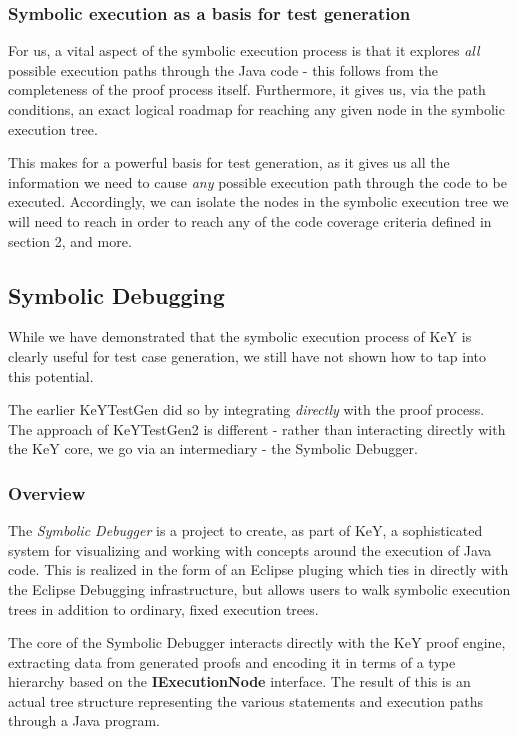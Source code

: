 \documentclass{article}
\newcommand{\tmem}[1]{{\em #1\/}}
\newcommand{\tmstrong}[1]{\textbf{#1}}
\begin{document}
\subsubsection{Symbolic execution as a basis for test generation}

For us, a vital aspect of the symbolic execution process is that it explores
{\tmem{all}} possible execution paths through the Java code - this follows
from the completeness of the proof process itself. Furthermore, it gives us,
via the path conditions, an exact logical roadmap for reaching any given node
in the symbolic execution tree.



This makes for a powerful basis for test generation, as it gives us all the
information we need to cause {\tmem{any}} possible execution path through the
code to be executed. Accordingly, we can isolate the nodes in the symbolic
execution tree we will need to reach in order to reach any of the code
coverage criteria defined in section 2, and more.

\subsection{Symbolic Debugging}

While we have demonstrated that the symbolic execution process of KeY is
clearly useful for test case generation, we still have not shown how to tap
into this potential.



The earlier KeYTestGen did so by integrating {\tmem{directly}} with the proof
process. The approach of KeYTestGen2 is different - rather than interacting
directly with the KeY core, we go via an intermediary - the Symbolic Debugger.



\subsubsection{Overview}

The {\tmem{Symbolic Debugger}} is a project to create, as part of KeY, a
sophisticated system for visualizing and working with concepts around the
execution of Java code. This is realized in the form of an Eclipse pluging
which ties in directly with the Eclipse Debugging infrastructure, but allows
users to walk symbolic execution trees in addition to ordinary, fixed
execution trees.



The core of the Symbolic Debugger interacts directly with the KeY proof
engine, extracting data from generated proofs and encoding it in terms of a
type hierarchy based on the {\tmstrong{IExecutionNode}} interface. The result
of this is an actual tree structure representing the various statements and
execution paths through a Java program.
\end{document}
